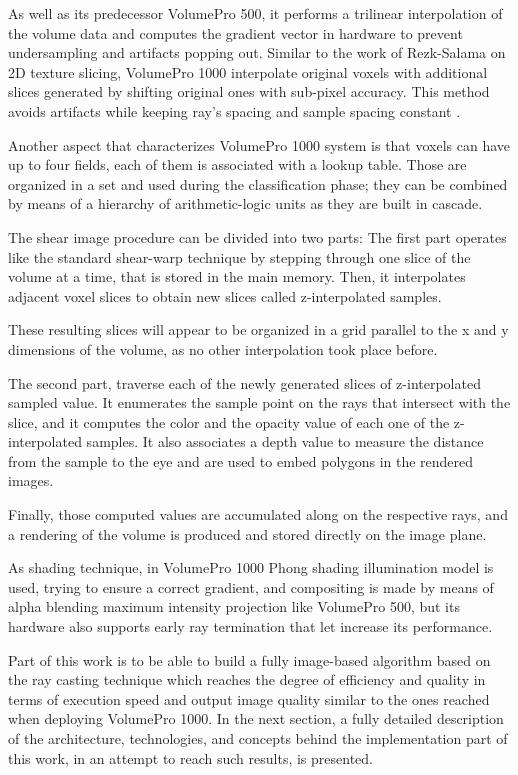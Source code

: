 \documentclass[12pt,a4paper]{extarticle}
\newcommand{\linespace}{\vspace{0pt}}
\begin{document}
As well as its predecessor VolumePro 500, it performs a trilinear interpolation of the volume data and computes the gradient vector in hardware to prevent undersampling and artifacts popping out. Similar to the work of Rezk-Salama on 2D texture slicing, VolumePro 1000 interpolate original voxels with additional slices generated by shifting original ones with sub-pixel accuracy. This method avoids artifacts while keeping ray's spacing and sample spacing constant \cite{PFISTER2005229}.


Another aspect that characterizes VolumePro 1000 system is that voxels can have up to four fields, each of them is associated with a lookup table. Those are organized in a set and used during the classification phase; they can be combined by means of a hierarchy of arithmetic-logic units as they are built in cascade.
\linespace

The shear image procedure can be divided into two parts: The first part operates like the standard shear-warp technique by stepping through one slice of the volume at a time, that is stored in the main memory. Then, it interpolates adjacent voxel slices to obtain new slices called z-interpolated samples. 

These resulting slices will appear to be organized in a grid parallel to the x and y dimensions of the volume, as no other interpolation took place before.
\linespace

The second part, traverse each of the newly generated slices of z-interpolated sampled value. It enumerates the sample point on the rays that intersect with the slice, and it computes the color and the opacity value of each one of the z-interpolated samples. It also associates a depth value to measure the distance from the sample to the eye and are used to embed polygons in the rendered images.

Finally, those computed values are accumulated along on the respective rays, and a rendering of the volume is produced and stored directly on the image plane.

\linespace

As shading technique, in VolumePro 1000  Phong shading illumination model is used, trying to ensure a correct gradient, and compositing is made by means of alpha blending maximum intensity projection like  VolumePro 500, but its hardware also supports early ray termination that let increase its performance.

\linespace
Part of this work is to be able to build a fully image-based algorithm based on the ray casting technique which reaches the degree of efficiency and quality in terms of execution speed and output image quality similar to the ones reached when deploying VolumePro 1000. In the next section, a fully detailed description of the architecture, technologies, and concepts behind the implementation part of this work, in an attempt to reach such results, is presented.
\pagebreak
\end{document}
